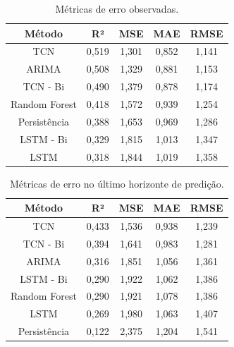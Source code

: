 
\begin{table}[h] %
    \centering
    \begin{tabular}{|c|c|c|c|c|}
    \hline
    \textbf{Método} & \textbf{R²} & \textbf{MSE} & \textbf{MAE} & \textbf{RMSE} \\ \hline
    TCN & 0,519 & 1,301 & 0,852 & 1,141 \\ \hline
    ARIMA & 0,508 & 1,329 & 0,881 & 1,153 \\ \hline
    TCN - Bi & 0,490 & 1,379 & 0,878 & 1,174 \\ \hline
    Random Forest & 0,418 & 1,572 & 0,939 & 1,254 \\ \hline
    Persistência & 0,388 & 1,653 & 0,969 & 1,286 \\ \hline
    LSTM - Bi & 0,329 & 1,815 & 1,013 & 1,347 \\ \hline
    LSTM & 0,318 & 1,844 & 1,019 & 1,358 \\ \hline
    \end{tabular}
    \caption{Métricas de erro observadas.}
    \label{tab:error_all}
\end{table}

\begin{table}[h] %
    \centering
    \begin{tabular}{|c|c|c|c|c|}
    \hline
    \textbf{Método} & \textbf{R²} & \textbf{MSE} & \textbf{MAE} & \textbf{RMSE} \\ \hline
    TCN & 0,433 & 1,536 & 0,938 & 1,239 \\ \hline
    TCN - Bi & 0,394 & 1,641 & 0,983 & 1,281 \\ \hline
    ARIMA & 0,316 & 1,851 & 1,056 & 1,361 \\ \hline
    LSTM - Bi & 0,290 & 1,922 & 1,062 & 1,386 \\ \hline
    Random Forest & 0,290 & 1,921 & 1,078 & 1,386 \\ \hline
    LSTM & 0,269 & 1,980 & 1,063 & 1,407 \\ \hline
    Persistência & 0,122 & 2,375 & 1,204 & 1,541 \\ \hline
    \end{tabular}
    \caption{Métricas de erro no último horizonte de predição.}
    \label{tab:error_h36}
\end{table}
